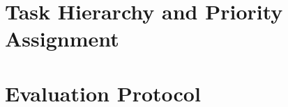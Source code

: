 \section{Task Hierarchy and Priority Assignment}
\label{sec:task-hierarchy}


\lipsum[24]


\begin{criticalinsight}
\end{criticalinsight}

\section{Evaluation Protocol}
\label{sec:eval-protocol}


\lipsum[25]

\begin{criticalinsight}
\end{criticalinsight}
